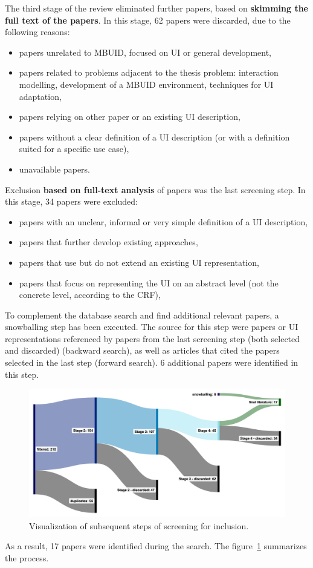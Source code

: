 The third stage of the review eliminated further papers, based on \textbf{skimming the full text of the papers}.
In this stage, 62 papers were discarded, due to the following reasons:
\begin{itemize}
    \item papers unrelated to MBUID, focused on UI or general development,
    \item papers related to problems adjacent to the thesis problem: interaction modelling, development of a MBUID environment, techniques for UI adaptation,
    \item papers relying on other paper or an existing UI description,
    \item papers without a clear definition of a UI description (or with a definition suited for a specific use case),
    \item unavailable papers.
\end{itemize}

Exclusion \textbf{based on full-text analysis} of papers was the last screening step.
In this stage, 34 papers were excluded:
\begin{itemize}
    \item papers with an unclear, informal or very simple definition of a UI description,
    \item papers that further develop existing approaches,
    \item papers that use but do not extend an existing UI representation,
    \item papers that focus on representing the UI on an abstract level (not the concrete level, according to the CRF),
\end{itemize}

To complement the database search and find additional relevant papers, a snowballing step has been executed.
The source for this step were papers or UI representations referenced by papers from the last screening step (both selected and discarded) (backward search), as well as articles that cited the papers selected in the last step (forward search).
6 additional papers were identified in this step.

\begin{figure}
    \centering
    \includegraphics[width=\textwidth]{./2-literature-review/conducting-the-search}
    \caption{Visualization of subsequent steps of screening for inclusion.}
    \label{fig:conducting-the-search-vis}
\end{figure}

As a result, 17 papers were identified during the search.
The figure~\ref{fig:conducting-the-search-vis} summarizes the process.

